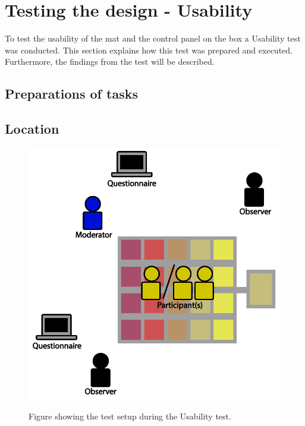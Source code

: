 






\section{Testing the design - Usability}
To test the usability of the mat and the control panel on the box a Usability test was conducted. This section explains how this test was prepared and executed. Furthermore, the findings from the test will be described.

\subsection{Preparations of tasks}

\subsection{Location}
\begin{figure}[H]
	\centering
	\includegraphics[width=0.7\linewidth]{figure/Design/usability}
	\label{fig:usabilityTest}
	\caption{Figure showing the test setup during the Usability test.}	
\end{figure}

